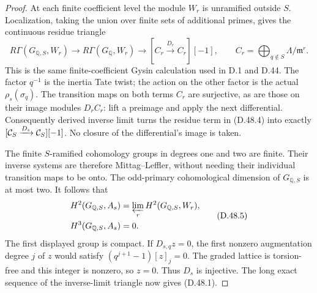\begin{proof}
At each finite coefficient level the module
\(W_r\) is unramified outside \(S\).
Localization, taking the union over finite
sets of additional primes, gives the
continuous residue triangle
\[
 R\Gamma(G_{\mathbb Q,S},W_r)
 \longrightarrow R\Gamma(G_{\mathbb Q},W_r)
 \longrightarrow
 [C_r\xrightarrow{D_r}C_r][-1],
 \qquad
 C_r=\bigoplus_{q\notin S}\Lambda/\mathfrak m^r .
                                                               \tag{D.48.4}
\]
This is the same finite-coefficient Gysin
calculation used in D.1 and D.44.
The factor \(q^{-1}\) is the inertia
Tate twist; the action on the other
factor is the actual \(\rho_s(\sigma_q)\).
The transition maps on both terms \(C_r\)
are surjective, as are those on their
image modules \(D_rC_r\): lift a
preimage and apply the next differential.
Consequently derived inverse limit
turns the residue term in (D.48.4)
into exactly
\([{\cal C}_S\xrightarrow{D_s}{\cal C}_S][-1]\).
No closure of the differential's image
is taken.

The finite \(S\)-ramified cohomology
groups in degrees one and two are finite.
Their inverse systems are therefore
Mittag--Leffler, without needing their
individual transition maps to be onto.
The odd-primary cohomological dimension
of \(G_{\mathbb Q,S}\) is at most two.
It follows that
\[
 \begin{split}
 H^2(G_{\mathbb Q,S},A_s)
       &=\varprojlim_rH^2(G_{\mathbb Q,S},W_r),\\
 H^3(G_{\mathbb Q,S},A_s)&=0. 
 \end{split}                                                   \tag{D.48.5}
\]
The first displayed group is compact.
If \(D_{s,q}z=0\), the first nonzero
augmentation degree \(j\) of \(z\)
would satisfy
\((q^{j+1}-1)[z]_j=0\).
The graded lattice is torsion-free
and this integer is nonzero, so
\(z=0\). Thus \(D_s\) is injective.
The long exact sequence of the
inverse-limit triangle now gives
(D.48.1).


\end{proof}
